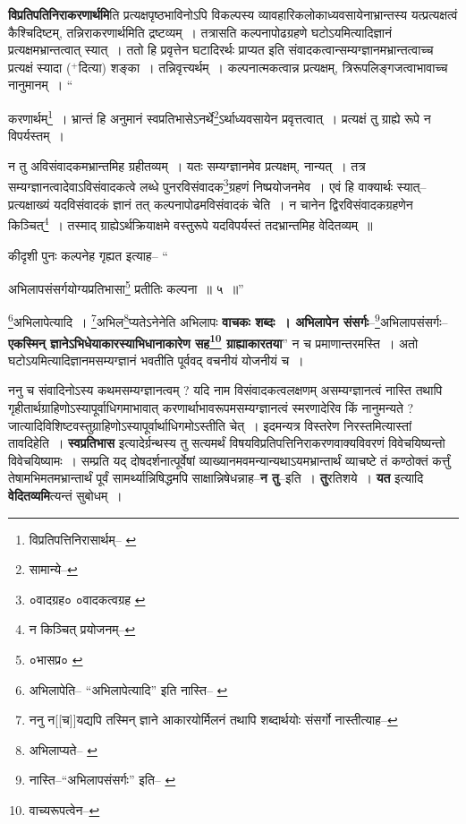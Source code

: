 \documentclass[article,12pt,a4paper]{memoir}
\newcommand{\add}[1]{($^{+}$#1)}
\begin{document}
	  \pstart \textbf{विप्रतिपतिनिराकरणार्थमि}ति प्रत्यक्षपृष्ठभाविनोऽपि विकल्पस्य व्यावहारिकलोकाध्यवसायेनाभ्रान्तस्य यत्प्रत्यक्षत्वं कैश्चिदिष्टम्, तन्नि\leavevmode{}राकरणार्थमिति द्रष्टव्यम् । तत्रासति कल्पनापोढग्रहणे घटोऽयमित्यादिज्ञानं प्रत्यक्षमभ्रान्तत्वात् स्यात् । ततो हि प्रवृत्तेन घटादिरर्थः प्राप्यत इति संवादकत्वान्सम्यग्ज्ञानमभ्रान्तत्वाच्च प्रत्यक्षं स्यादा \add{दित्या} शङ्का । तन्निवृत्त्यर्थम् । कल्पनात्मकत्वान्न प्रत्यक्षम्, त्रिरूपलिङ्गजत्वाभावाच्च नानुमानम् ।  \leavevmode{} “
	  
	करणार्थम्\footnote{विप्रतिपत्तिनिरासार्थम्--\cite{dp-msB} \cite{dp-msC} \cite{dp-msD} \cite{dp-edN}} । भ्रान्तं हि अनुमानं स्वप्रतिभासेऽनर्थे\footnote{सामान्ये--\cite{dp-msD-n}}\-ऽर्थाध्यवसायेन प्रवृत्तत्वात् । प्रत्यक्षं तु ग्राह्ये रूपे न विपर्यस्तम् । 
	  
	न तु अविसंवादकमभ्रान्तमिह ग्रहीतव्यम् । यतः सम्यग्ज्ञानमेव प्रत्यक्षम्, नान्यत् । तत्र सम्यग्ज्ञानत्वादेवाऽविसंवादकत्वे लब्धे पुनरविसंवादक\footnote{०वादग्रह० \cite{dp-edE} ०वादकत्वग्रह \cite{dp-msC}}\-ग्रहणं निष्प्रयोजनमेव । एवं हि वाक्यार्थः स्यात्--प्रत्यक्षाख्यं यदविसंवादकं ज्ञानं तत् कल्पनापोढमविसंवादकं चेति । न चानेन द्विरविसंवादकग्रहणेन किञ्चित्\footnote{न किञ्चित् प्रयोजनम्--\cite{dp-msD-n}} । तस्माद् ग्राह्येऽर्थक्रियाक्षमे वस्तुरूपे यदविपर्यस्तं तदभ्रान्तमिह वेदितव्यम् ॥ 
	  
	कीदृशी पुनः कल्पनेह गृह्यत इत्याह-- “
	  
	अभिलापसंसर्गयोग्यप्रतिभासा\footnote{०भासप्र० \cite{dp-msB} \cite{dp-edP} \cite{dp-edE} \cite{dp-edH} \cite{dp-edN}} प्रतीतिः कल्पना ॥ ५ ॥” 
	  
	\footnote{अभिलापेति--\cite{dp-edE} \cite{dp-edP} “अभिलापेत्यादि” इति नास्ति--\cite{dp-msA} \cite{dp-msB} \cite{dp-edH} \cite{dp-edN}}\-अभिलापेत्यादि । \footnote{ननु न[[च]]यद्यपि तस्मिन् ज्ञाने आकारयोर्मिलनं तथापि शब्दार्थयोः संसर्गो नास्तीत्याह--\cite{dp-msD-n}}\-अभिल\footnote{अभिलाप्यते--\cite{dp-msA} \cite{dp-edP} \cite{dp-edH} \cite{dp-edE}}\-प्यतेऽनेनेति अभिलापः \textbf{वाचकः शब्दः । अभिलापेन संसर्गः}--\footnote{नास्ति--“अभिलापसंसर्गः” इति--\cite{dp-msA} \cite{dp-edP} \cite{dp-edE}}\-अभिलापसंसर्गः--\textbf{एकस्मिन् ज्ञानेऽभिधेयाकारस्याभिधानाकारेण सह\footnote{वाच्यरूपत्वेन--\cite{dp-msD-n}} ग्राह्याकारतया}” न च प्रमाणान्तरमस्ति । अतो घटोऽयमित्यादिज्ञानमसम्यग्ज्ञानं भवतीति पूर्ववद् वचनीयं योजनीयं च ।
	\pend
      

	  \pstart ननु च संवादिनोऽस्य कथमसम्यग्ज्ञानत्वम् ? यदि नाम विसंवादकत्वलक्षणम् असम्यग्ज्ञानत्वं नास्ति तथापि गृहीतार्थग्राहिणोऽस्यापूर्वाधिगमाभावात् करणार्थाभावरूपमसम्यग्ज्ञानत्वं स्मरणादेरिव किं नानुमन्यते ? जात्यादिविशिष्टवस्तुग्राहिणोऽस्यापूर्वार्थाधिगमोऽस्तीति चेत् । इदमन्यत्र विस्तरेण निरस्तमित्यास्तां तावदिहेति । \textbf{स्वप्रतिभास} इत्यादेर्ग्रन्थस्य तु सत्यमर्थं विषयविप्रतिपत्तिनिराकरणवाक्यविवरणं विवेचयिष्यन्तो विवेचयिष्यामः । सम्प्रति यद् दोषदर्शनात्पूर्वेषां व्याख्यानमवमन्यान्यथाऽयमभ्रान्तार्थं व्याचष्टे तं कण्ठोक्तं कर्त्तुं तेषामभिमतमभ्रान्तार्थं पूर्वं सामर्थ्यान्निषिद्धमपि साक्षान्निषेधन्नाह--\textbf{न तु}--इति । \textbf{तु}रतिशये । \textbf{यत} इत्यादि \textbf{वेदितव्यमि}त्यन्तं सुबोधम् ।
	\pend
      
\end{document}
